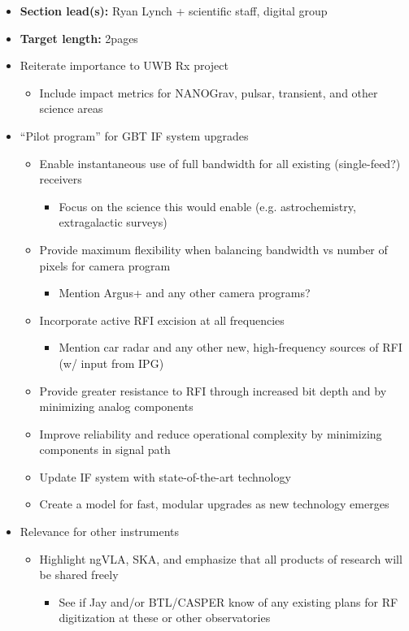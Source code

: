 \documentclass[10pt]{NSF}
\begin{document}
\begin{itemize}
\item{\textbf{Section lead(s):} Ryan Lynch + scientific staff, digital
    group}
\item{\textbf{Target length:} 2pages}
\item{Reiterate importance to UWB Rx project}
  \begin{itemize}
  \item{Include impact metrics for NANOGrav, pulsar, transient, and
      other science areas}
  \end{itemize}
\item{``Pilot program'' for GBT IF system upgrades}
  \begin{itemize}
  \item{Enable instantaneous use of full bandwidth for all existing
      (single-feed?) receivers}
    \begin{itemize}
    \item{Focus on the science this would enable (e.g. astrochemistry,
        extragalactic surveys)}
    \end{itemize}
  \item{Provide maximum flexibility when balancing bandwidth vs number
      of pixels for camera program}
    \begin{itemize}
    \item{Mention Argus+ and any other camera programs?}
    \end{itemize}
  \item{Incorporate active RFI excision at all frequencies}
    \begin{itemize}
    \item{Mention car radar and any other new, high-frequency sources
        of RFI (w/ input from IPG)}
    \end{itemize}
  \item{Provide greater resistance to RFI through increased bit depth
      and by minimizing analog components}
  \item{Improve reliability and reduce operational complexity by
      minimizing components in signal path}
  \item{Update IF system with state-of-the-art technology}
  \item{Create a model for fast, modular upgrades as new technology
      emerges}
  \end{itemize}
\item{Relevance for other instruments}
  \begin{itemize}
  \item{Highlight ngVLA, SKA, and emphasize that all products of
      research will be shared freely}
    \begin{itemize}
    \item{See if Jay and/or BTL/CASPER know of any existing plans for
        RF digitization at these or other observatories}
    \end{itemize}
  \end{itemize}
\end{itemize}
\end{document}
